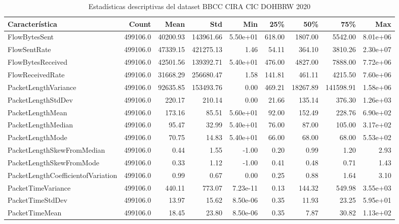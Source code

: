 \begin{table}[H]
    \centering
    \caption{Estadísticas descriptivas del dataset BBCC CIRA CIC DOHBRW 2020}
    \label{tab:eda_stats}
    \small
    \begin{tabular}{|l|r|r|r|r|r|r|r|r|}
        \hline
        \textbf{Característica} & \textbf{Count} & \textbf{Mean} & \textbf{Std} & \textbf{Min} & \textbf{25\%} & \textbf{50\%} & \textbf{75\%} & \textbf{Max} \\
        \hline
        FlowBytesSent & 499106.0 & 40200.93 & 143961.66 & 5.50e+01 & 618.00 & 1807.00 & 5542.00 & 8.01e+06 \\
        FlowSentRate & 499106.0 & 47339.15 & 421275.13 & 1.46 & 54.11 & 364.10 & 3810.26 & 2.30e+07 \\
        FlowBytesReceived & 499106.0 & 42501.56 & 139392.71 & 5.40e+01 & 476.00 & 4827.00 & 7888.00 & 7.72e+06 \\
        FlowReceivedRate & 499106.0 & 31668.29 & 256680.47 & 1.58 & 141.81 & 461.11 & 4215.50 & 7.60e+06 \\
        PacketLengthVariance & 499106.0 & 92635.85 & 153493.76 & 0.00 & 469.21 & 18267.89 & 141598.91 & 1.58e+06 \\
        PacketLengthStdDev & 499106.0 & 220.17 & 210.14 & 0.00 & 21.66 & 135.14 & 376.30 & 1.26e+03 \\
        PacketLengthMean & 499106.0 & 173.16 & 85.51 & 5.60e+01 & 92.00 & 152.49 & 228.76 & 6.90e+02 \\
        PacketLengthMedian & 499106.0 & 95.47 & 32.99 & 5.40e+01 & 76.00 & 87.00 & 105.00 & 3.17e+02 \\
        PacketLengthMode & 499106.0 & 70.75 & 14.83 & 5.40e+01 & 66.00 & 68.00 & 68.00 & 5.53e+02 \\
        PacketLengthSkewFromMedian & 499106.0 & 0.44 & 1.55 & -1.00 & 0.20 & 0.99 & 1.20 & 2.93 \\
        PacketLengthSkewFromMode & 499106.0 & 0.33 & 1.12 & -1.00 & 0.41 & 0.48 & 0.71 & 1.43 \\
        PacketLengthCoefficientofVariation & 499106.0 & 0.99 & 0.67 & 0.00 & 0.25 & 0.88 & 1.64 & 3.10 \\
        PacketTimeVariance & 499106.0 & 440.11 & 773.07 & 7.23e-11 & 0.13 & 144.32 & 549.98 & 3.55e+03 \\
        PacketTimeStdDev & 499106.0 & 13.97 & 15.62 & 8.50e-06 & 0.35 & 11.93 & 23.25 & 5.95e+01 \\
        PacketTimeMean & 499106.0 & 18.45 & 23.80 & 8.50e-06 & 0.35 & 7.87 & 30.82 & 1.13e+02 \\

\end{tabular}
\end{table}
